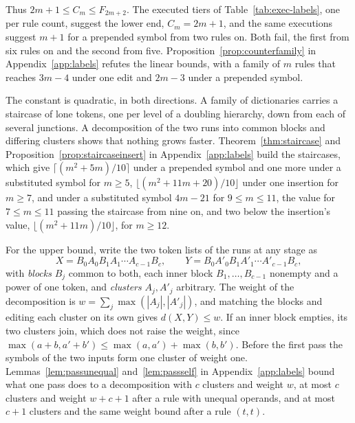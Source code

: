 \documentclass[11pt,a4paper]{article}
\theoremstyle{definition}
\theoremstyle{plain}
\begin{document}
Thus \(2m + 1 \le C_m \le F_{2m+2}\). The executed tiers of Table~\ref{tab:exec-labels}, one per rule count, suggest the
lower end, \(C_m = 2m + 1\), and the same executions suggest \(m + 1\) for a prepended symbol from two rules on. Both
fail, the first from six rules on and the second from five. Proposition~\ref{prop:counterfamily} in
Appendix~\ref{app:labels} refutes the linear bounds, with a family of \(m\) rules that reaches \(3m - 4\) under one edit
and \(2m - 3\) under a prepended symbol.

The constant is quadratic, in both directions. A family of dictionaries carries a staircase of lone tokens, one per
level of a doubling hierarchy, down from each of several junctions. A decomposition of the two runs into common blocks
and differing clusters shows that nothing grows faster. Theorem~\ref{thm:staircase} and
Proposition~\ref{prop:staircaseinsert} in Appendix~\ref{app:labels} build the staircases, which give
\(\lceil (m^2 + 5m)/10 \rceil\) under a prepended symbol and one more under a substituted symbol for \(m \ge 5\),
\(\lfloor (m^2 + 11m + 20)/10 \rfloor\) under one insertion for \(m \ge 7\), and under a substituted symbol \(4m - 21\)
for \(9 \le m \le 11\), the value for \(7 \le m \le 11\) passing the staircase from nine on, and two below the
insertion's value, \(\lfloor (m^2 + 11m)/10 \rfloor\), for \(m \ge 12\).

For the upper bound, write the two token lists of the runs at any stage as
\[ X = B_0 A_0 B_1 A_1 \cdots A_{c-1} B_c, \qquad Y = B_0 A'_0 B_1 A'_1 \cdots A'_{c-1} B_c, \]
with \emph{blocks} \(B_j\) common to both, each inner block \(B_1, \dots, B_{c-1}\) nonempty and a power of one token,
and \emph{clusters} \(A_j, A'_j\) arbitrary. The weight of the decomposition is \(w = \sum_j \max(|A_j|, |A'_j|)\), and
matching the blocks and editing each cluster on its own gives \(d(X, Y) \le w\). If an inner block empties, its two
clusters join, which does not raise the weight, since \(\max(a + b, a' + b') \le \max(a, a') + \max(b, b')\). Before the
first pass the symbols of the two inputs form one cluster of weight one. Lemmas~\ref{lem:passunequal}
and~\ref{lem:passself} in Appendix~\ref{app:labels} bound what one pass does to a decomposition with \(c\) clusters and
weight \(w\), at most \(c\) clusters and weight \(w + c + 1\) after a rule with unequal operands, and at most \(c + 1\)
clusters and the same weight bound after a rule \((t, t)\).

\end{document}
